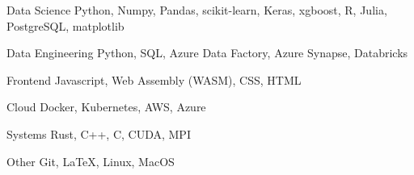 
\begin{cvskills}

\cvskill
  {Data Science} %
  {Python, Numpy, Pandas, scikit-learn, Keras, xgboost, R, Julia, PostgreSQL, matplotlib}

\cvskill
  {Data Engineering} %
  {Python, SQL, Azure Data Factory, Azure Synapse, Databricks}


\cvskill
  {Frontend} %
  {Javascript, Web Assembly (WASM), CSS, HTML}

\cvskill
  {Cloud} %
  {Docker, Kubernetes, AWS, Azure}

\cvskill
  {Systems} %
  {Rust, C++, C, CUDA, MPI}

\cvskill
  {Other} %
  {Git, \LaTeX, Linux, MacOS}

\end{cvskills}
